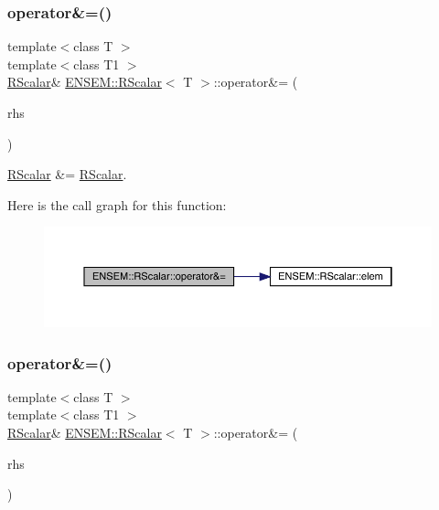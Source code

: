 \subsubsection{\texorpdfstring{operator\&=()}{operator\&=()}\hspace{0.1cm}{\footnotesize\ttfamily [1/3]}}
{\footnotesize\ttfamily template$<$class T $>$ \\
template$<$class T1 $>$ \\
\mbox{\hyperlink{classENSEM_1_1RScalar}{R\+Scalar}}\& \mbox{\hyperlink{classENSEM_1_1RScalar}{E\+N\+S\+E\+M\+::\+R\+Scalar}}$<$ T $>$\+::operator\&= (\begin{DoxyParamCaption}\item[{const \mbox{\hyperlink{classENSEM_1_1RScalar}{R\+Scalar}}$<$ T1 $>$ \&}]{rhs }\end{DoxyParamCaption})\hspace{0.3cm}{\ttfamily [inline]}}



\mbox{\hyperlink{classENSEM_1_1RScalar}{R\+Scalar}} \&= \mbox{\hyperlink{classENSEM_1_1RScalar}{R\+Scalar}}. 

Here is the call graph for this function\+:
\nopagebreak
\begin{figure}[H]
\begin{center}
\leavevmode
\includegraphics[width=350pt]{d0/d8c/classENSEM_1_1RScalar_aa091ededdea0fc13deb359321f213780_cgraph}
\end{center}
\end{figure}
\mbox{\label{classENSEM_1_1RScalar_aa091ededdea0fc13deb359321f213780}} 
\subsubsection{\texorpdfstring{operator\&=()}{operator\&=()}\hspace{0.1cm}{\footnotesize\ttfamily [2/3]}}
{\footnotesize\ttfamily template$<$class T $>$ \\
template$<$class T1 $>$ \\
\mbox{\hyperlink{classENSEM_1_1RScalar}{R\+Scalar}}\& \mbox{\hyperlink{classENSEM_1_1RScalar}{E\+N\+S\+E\+M\+::\+R\+Scalar}}$<$ T $>$\+::operator\&= (\begin{DoxyParamCaption}\item[{const \mbox{\hyperlink{classENSEM_1_1RScalar}{R\+Scalar}}$<$ T1 $>$ \&}]{rhs }\end{DoxyParamCaption})\hspace{0.3cm}{\ttfamily [inline]}}




